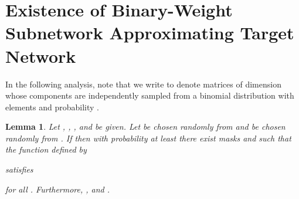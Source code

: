 \documentclass{article} \usepackage{iclr2021_conference,times}
\newtheorem{lemma}{Lemma}
\begin{document}
\section{Existence of Binary-Weight Subnetwork Approximating Target Network} \label{sec:new-existence-bin-init}

In the following analysis, note that we write  to denote matrices of dimension  whose components are independently sampled from a binomial distribution with elements  and probability .

\begin{lemma} \label{lem:new-bin-init-two-layer}
Let , , , and  be given. Let  be chosen randomly from  and  be chosen randomly from . If 
then with probability at least  there exist masks  and  such that the function  defined by

satisfies

for all . Furthermore, , and .
\end{lemma}
\end{document}
